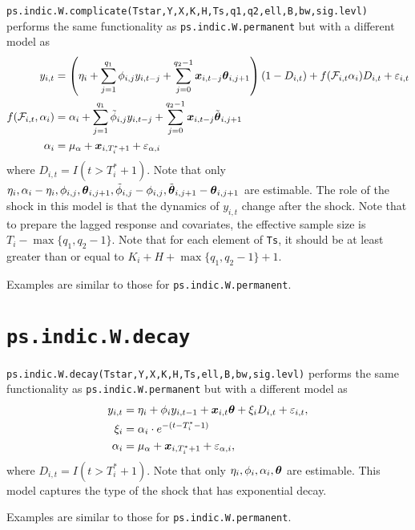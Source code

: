 \documentclass[12pt]{article}
\begin{document}
 \texttt{ps.indic.W.complicate(Tstar,Y,X,K,H,Ts,q1,q2,ell,B,bw,sig.levl)} performs the same functionality as  \texttt{ps.indic.W.permanent} but with a different model as 
 \begin{align*}
 	y_{i,t}
 	&= \left(\eta_i + \sum_{j=1}^{q_1} \phi_{i,j} y_{i, t-j} + \sum_{j=0}^{q_2-1} \boldsymbol{x}_{i, t-j}\boldsymbol{\theta}_{i, j + 1} \right) (1-D_{i,t}) + f(\mathcal{F}_{i, t} \alpha_i)D_{i,t} + \varepsilon_{i,t}  \\
 	f(\mathcal{F}_{i,t},\alpha_i)	 & = \alpha_i +\sum_{j=1}^{q_1} \tilde{\phi}_{i, j} y_{i, t-j} + \sum_{j=0}^{q_2-1} \boldsymbol{x}_{i, t-j} \tilde{\boldsymbol{\theta}}_{i, j +1} \\
 	\alpha_i & = \mu_{\alpha} + \boldsymbol{x}_{i, T_i^*+1} + \varepsilon_{\alpha, i}
 \end{align*}
 where $D_{i,t}=I(t > T_i^*+1)$. Note that only $\eta_i, \alpha_i - \eta_i, \phi_{i,j}, \boldsymbol{\theta}_{i, j+1}, \tilde{\phi}_{i,j}-\phi_{i,j}, \tilde{\boldsymbol{\theta}}_{i,j+1}-\boldsymbol{\theta}_{i, j+1}$ are estimable.
The role of the shock in this model is that the dynamics of $y_{i,t}$ change after the shock. Note that to prepare the lagged response and covariates, the effective sample size is $T_i-\max\{q_1, q_2-1\}$.  Note that for each element of \texttt{Ts}, it should be at least greater than or equal to $K_i + H + \max\{q_1, q_2-1\}+1$.

Examples are similar to those for \texttt{ps.indic.W.permanent}.

\section{\texttt{ps.indic.W.decay}}
 
 \texttt{ps.indic.W.decay(Tstar,Y,X,K,H,Ts,ell,B,bw,sig.levl)} performs the same functionality as  \texttt{ps.indic.W.permanent} but with a different model as 
 \begin{align*}
 	y_{i,t} &= \eta_i + \phi_i y_{i, t-1}  + \boldsymbol{x}_{i, t}\boldsymbol{\theta} + \xi_i D_{i,t} + \varepsilon_{i,t},\\
 	\xi_i &= \alpha_i \cdot e^{-(t-T_i^*-1)} \\
 	\alpha_i & = \mu_{\alpha} + \boldsymbol{x}_{i, T_i^*+1} + \varepsilon_{\alpha, i},
 \end{align*}
 where $D_{i,t}=I(t > T_i^*+1)$. Note that only $\eta_i, \phi_i, \alpha_i, \boldsymbol{\theta}$ are estimable. This model captures the type of the shock that has exponential decay.
 
 Examples are similar to those for \texttt{ps.indic.W.permanent}.
 
\end{document}
